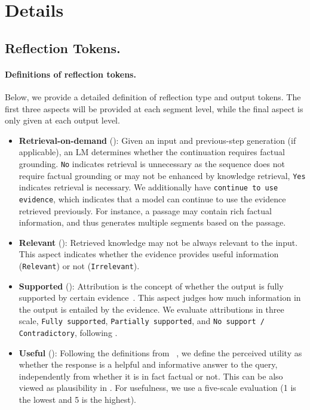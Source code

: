 \startcontents[sections]
\newpage


\section{\model Details} 
\subsection{Reflection Tokens.}
\label{sec:data_collection_gpt4}
\paragraph{Definitions of reflection tokens.} Below, we provide a detailed definition of reflection type and output tokens.   
The first three aspects will be provided at each segment level, while the final aspect is only given at each output level.
\begin{itemize}[leftmargin=*]
    \item {\bf Retrieval-on-demand} (\ret): Given an input and previous-step generation (if applicable), an LM determines whether the continuation requires factual grounding. 
    \texttt{No} indicates retrieval is unnecessary as the sequence does not require factual grounding or may not be enhanced by knowledge retrieval, \texttt{Yes} indicates retrieval is necessary. 
    We additionally have \texttt{continue to use evidence}, which indicates that a model can continue to use the evidence retrieved previously. For instance, a passage may contain rich factual information, and thus \model generates multiple segments based on the passage. 
    \item {\bf Relevant} (\crel): Retrieved knowledge may not be always relevant to the input. This aspect indicates whether the evidence provides useful information (\texttt{Relevant}) or not (\texttt{Irrelevant}). 
    \item {\bf Supported} (\cgr): Attribution is the concept of whether the output is fully supported by certain evidence~\citep{menick2022teaching,bohnet2022attributed}. 
    This aspect judges how much information in the output is entailed by the evidence. 
    We evaluate attributions in three scale, \texttt{Fully supported}, \texttt{Partially supported}, and \texttt{No support / Contradictory}, following \cite{yue2023automatic,nakano2021webgpt}. 
    \item {\bf Useful} (\cuse): Following the definitions from ~\cite{liu2023evaluating}, we define the perceived utility as whether the response is a helpful and informative answer to the query, independently from whether it is in fact factual or not. This can be also viewed as plausibility in \citet{menick2022teaching}. For usefulness, we use a five-scale evaluation (1 is the lowest and 5 is the highest).
\end{itemize}


